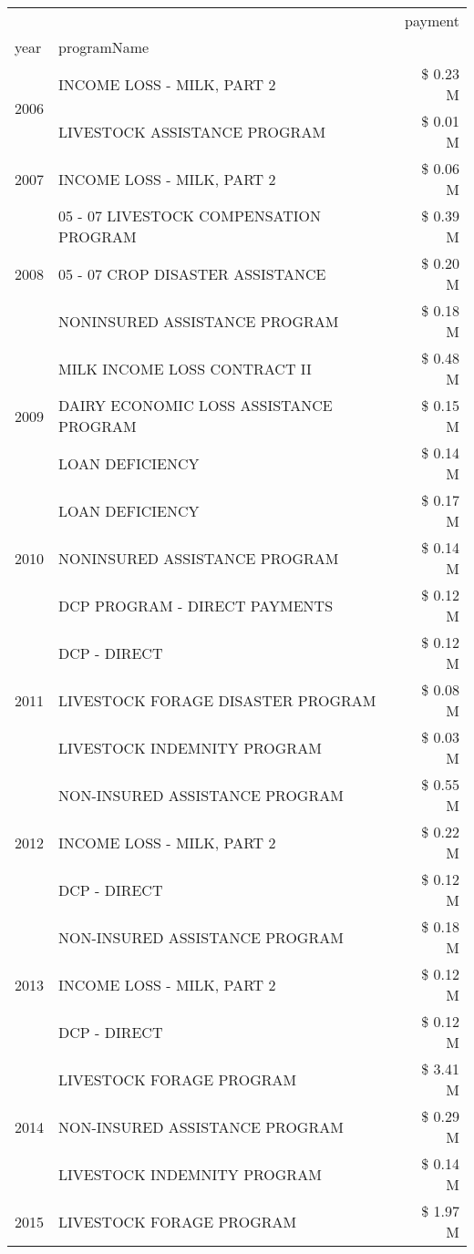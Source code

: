 \begin{tabular}{llr}
\toprule
 &  & payment \\
year & programName &  \\
\midrule
\multirow[t]{2}{*}{2006} & INCOME LOSS - MILK, PART 2 & \$ 0.23 M \\
 & LIVESTOCK ASSISTANCE PROGRAM & \$ 0.01 M \\
\cline{1-3}
2007 & INCOME LOSS - MILK, PART 2 & \$ 0.06 M \\
\cline{1-3}
\multirow[t]{3}{*}{2008} & 05 - 07 LIVESTOCK COMPENSATION PROGRAM & \$ 0.39 M \\
 & 05 - 07 CROP DISASTER ASSISTANCE & \$ 0.20 M \\
 & NONINSURED ASSISTANCE PROGRAM & \$ 0.18 M \\
\cline{1-3}
\multirow[t]{3}{*}{2009} & MILK INCOME LOSS CONTRACT II & \$ 0.48 M \\
 & DAIRY ECONOMIC LOSS ASSISTANCE PROGRAM & \$ 0.15 M \\
 & LOAN DEFICIENCY & \$ 0.14 M \\
\cline{1-3}
\multirow[t]{3}{*}{2010} & LOAN DEFICIENCY & \$ 0.17 M \\
 & NONINSURED ASSISTANCE PROGRAM & \$ 0.14 M \\
 & DCP PROGRAM - DIRECT PAYMENTS & \$ 0.12 M \\
\cline{1-3}
\multirow[t]{3}{*}{2011} & DCP - DIRECT & \$ 0.12 M \\
 & LIVESTOCK FORAGE DISASTER PROGRAM & \$ 0.08 M \\
 & LIVESTOCK INDEMNITY PROGRAM & \$ 0.03 M \\
\cline{1-3}
\multirow[t]{3}{*}{2012} & NON-INSURED ASSISTANCE PROGRAM & \$ 0.55 M \\
 & INCOME LOSS - MILK, PART 2 & \$ 0.22 M \\
 & DCP - DIRECT & \$ 0.12 M \\
\cline{1-3}
\multirow[t]{3}{*}{2013} & NON-INSURED ASSISTANCE PROGRAM & \$ 0.18 M \\
 & INCOME LOSS - MILK, PART 2 & \$ 0.12 M \\
 & DCP - DIRECT & \$ 0.12 M \\
\cline{1-3}
\multirow[t]{3}{*}{2014} & LIVESTOCK FORAGE PROGRAM & \$ 3.41 M \\
 & NON-INSURED ASSISTANCE PROGRAM & \$ 0.29 M \\
 & LIVESTOCK INDEMNITY PROGRAM & \$ 0.14 M \\
\cline{1-3}
\multirow[t]{3}{*}{2015} & LIVESTOCK FORAGE PROGRAM & \$ 1.97 M \\

\end{tabular}
